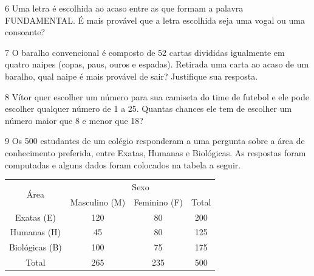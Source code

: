 \num{6} Uma letra é escolhida ao acaso entre as que formam a palavra
FUNDAMENTAL. É mais provável que a letra escolhida seja uma vogal ou uma consoante?

\begin{mdframed}[linewidth=2pt,linecolor=salmao,roundcorner=2pt]



\end{mdframed}

\num{7} O baralho convencional é composto de 52 cartas divididas igualmente em quatro
naipes (copas, paus, ouros e espadas). Retirada uma carta ao acaso de um baralho,
qual naipe é mais provável de sair? Justifique sua resposta.


\num{8} Vítor quer escolher um número para sua camiseta do time de futebol e ele
pode escolher qualquer número de 1 a 25. Quantas chances ele tem de
escolher um número maior que 8 e menor que 18?

\begin{mdframed}[linewidth=2pt,linecolor=salmao,roundcorner=2pt]


\end{mdframed}

\num{9} Os 500 estudantes de um colégio responderam a uma pergunta sobre a
área de conhecimento preferida, entre Exatas, Humanas e
Biológicas. As respostas foram computadas e alguns dados foram colocados
na tabela a seguir.

\begin{center}
\begin{tabular}{c|ccc}
\hline
\multirow{2}{*}{Área} & \multicolumn{3}{c}{Sexo} \\ \cline{2-4} 
 & \multicolumn{1}{c|}{Masculino (M)} & \multicolumn{1}{c|}{Feminino (F)} & Total \\ \hline
Exatas (E) & \multicolumn{1}{c|}{120} & \multicolumn{1}{c|}{80} & 200 \\ \hline
Humanas (H) & \multicolumn{1}{c|}{45} & \multicolumn{1}{c|}{80} & 125 \\ \hline
Biológicas (B) & \multicolumn{1}{c|}{100} & \multicolumn{1}{c|}{75} & 175 \\ \hline
Total & \multicolumn{1}{c|}{265} & \multicolumn{1}{c|}{235} & 500 \\ \hline
\end{tabular}
\end{center}

